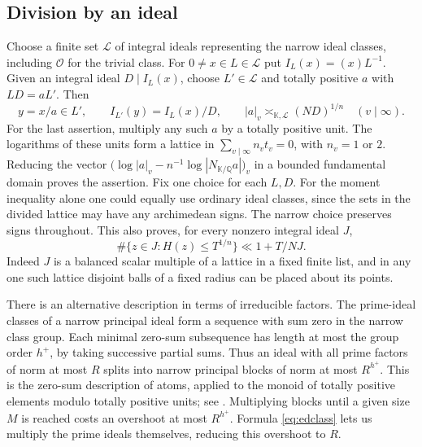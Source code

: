 \documentclass[11pt,letterpaper]{article}
\theoremstyle{definition}
\numberwithin{equation}{section}
\begin{document}
\subsection{Division by an ideal}
Choose a finite set $\mathcal L$ of integral ideals representing the narrow
ideal classes, including $\mathcal O$ for the trivial class. For
$0\ne x\in L\in\mathcal L$ put $I_L(x)=(x)L^{-1}$. Given an integral
ideal $D\mid I_L(x)$, choose $L'\in\mathcal L$ and totally positive $a$
with $LD=aL'$. Then
\begin{equation}\label{eq:edclass}
 y=x/a\in L',\qquad I_{L'}(y)=I_L(x)/D,\qquad
 |a|_v\asymp_{\mathbb K,\mathcal L}(ND)^{1/n}\quad(v\mid\infty).
\end{equation}
For the last assertion, multiply any such $a$ by a totally positive
unit. The logarithms of these units form a lattice in
$\sum_{v\mid\infty}n_v t_v=0$, with $n_v=1$ or $2$. Reducing the vector
$\bigl(\log|a|_v-n^{-1}\log |N_{\mathbb K/\mathbb Q}a|\bigr)_v$
in a bounded fundamental domain proves the assertion. Fix one choice
for each $L,D$. For the moment inequality alone one could equally use
ordinary ideal classes, since the sets in the divided lattice may have
any archimedean signs. The narrow choice preserves signs throughout.
This also proves, for every nonzero integral ideal $J$,
\begin{equation}\label{eq:edlattice}
 \#\{z\in J:H(z)\le T^{1/n}\}\ll 1+T/NJ .
\end{equation}
Indeed $J$ is a balanced scalar multiple of a lattice in a fixed finite
list, and in any one such lattice disjoint balls of a fixed radius can be
placed about its points.

There is an alternative description in terms of irreducible factors.
The prime-ideal classes of a narrow principal ideal form a sequence with
sum zero in the narrow class group. Each minimal zero-sum subsequence
has length at most the group order $h^+$, by taking successive partial
sums. Thus an ideal with all prime factors of norm at most $R$ splits
into narrow principal blocks of norm at most $R^{h^+}$. This is the
zero-sum description of atoms, applied to the monoid of totally positive
elements modulo totally positive units; see \cite{edhk84,edghk}. Multiplying
blocks until a given size $M$ is reached costs an overshoot at most
$R^{h^+}$. Formula \eqref{eq:edclass} lets us multiply the prime ideals
themselves, reducing this overshoot to $R$.
\end{document}
